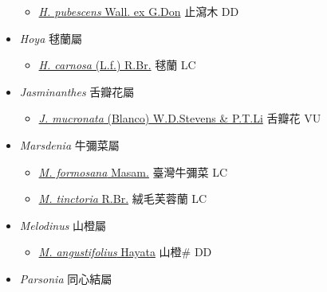 \begin{itemize}
  \begin{itemize}
        \item[] \href{http://www.theplantlist.org/tpl1.1/search?q=Holarrhena+pubescens}{\textit{H. pubescens} Wall. ex G.Don}   止瀉木 DD
  \end{itemize}
 \item[] \textit{Hoya} 毬蘭屬
                    
  \begin{itemize}
        \item[] \href{http://www.theplantlist.org/tpl1.1/search?q=Hoya+carnosa}{\textit{H. carnosa} (L.f.) R.Br.}   毬蘭 LC
  \end{itemize}
 \item[] \textit{Jasminanthes} 舌瓣花屬
                    
  \begin{itemize}
        \item[] \href{http://www.theplantlist.org/tpl1.1/search?q=Jasminanthes+mucronata}{\textit{J. mucronata} (Blanco) W.D.Stevens \& P.T.Li}   舌瓣花 VU
  \end{itemize}
 \item[] \textit{Marsdenia} 牛彌菜屬
                    
  \begin{itemize}
        \item[] \href{http://www.theplantlist.org/tpl1.1/search?q=Marsdenia+formosana}{\textit{M. formosana} Masam.}   臺灣牛彌菜 LC
        \item[] \href{http://www.theplantlist.org/tpl1.1/search?q=Marsdenia+tinctoria}{\textit{M. tinctoria} R.Br.}   絨毛芙蓉蘭 LC
  \end{itemize}
 \item[] \textit{Melodinus} 山橙屬
                    
  \begin{itemize}
        \item[] \href{http://www.theplantlist.org/tpl1.1/search?q=Melodinus+angustifolius}{\textit{M. angustifolius} Hayata}   山橙\# DD
  \end{itemize}
 \item[] \textit{Parsonia} 同心結屬
                    

\end{itemize}
